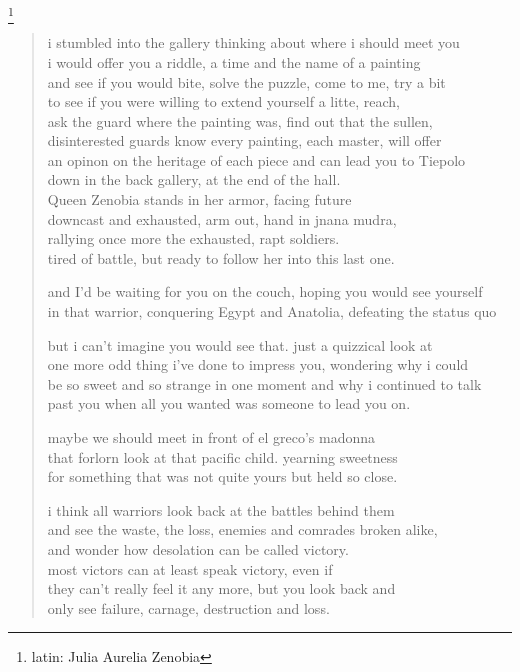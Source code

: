 
\footnote{latin: Julia Aurelia Zenobia}
\begin{verse}
i stumbled into the gallery thinking about where i should meet you \\
i would offer you a riddle, a time and the name of a painting \\
and see if you would bite, solve the puzzle, come to me, try a bit \\
to see if you were willing to extend yourself a litte, reach, \\
ask the guard where the painting was, find out that the sullen,
disinterested guards know every painting, each master, will offer \\
an opinon on the heritage of each piece and can lead you to Tiepolo \\
down in the back gallery, at the end of the hall. \\
Queen Zenobia stands in her armor, facing future \\
downcast and exhausted, arm out, hand in jnana mudra, \\
rallying once more the exhausted, rapt soldiers. \\
tired of battle, but ready to follow her into this last one.

and I'd be waiting for you on the couch, hoping you would see yourself \\
in that warrior, conquering Egypt and Anatolia, defeating the status quo 

but i can't imagine you would see that. just a quizzical look at \\
one more odd thing i've done to impress you, wondering why i could \\
be so sweet and so strange in one moment and why i continued to talk \\
past you when all you wanted was someone to lead you on. 

maybe we should meet in front of el greco's madonna \\
that forlorn look at that pacific child. yearning sweetness \\
for something that was not quite yours but held so close. 

i think all warriors look back at the battles behind them \\
and see the waste, the loss, enemies and comrades broken alike, \\
and wonder how desolation can be called victory. \\
most victors can at least speak victory, even if \\
they can't really feel it any more, but you look back and \\
only see failure, carnage, destruction and loss.


\end{verse}
